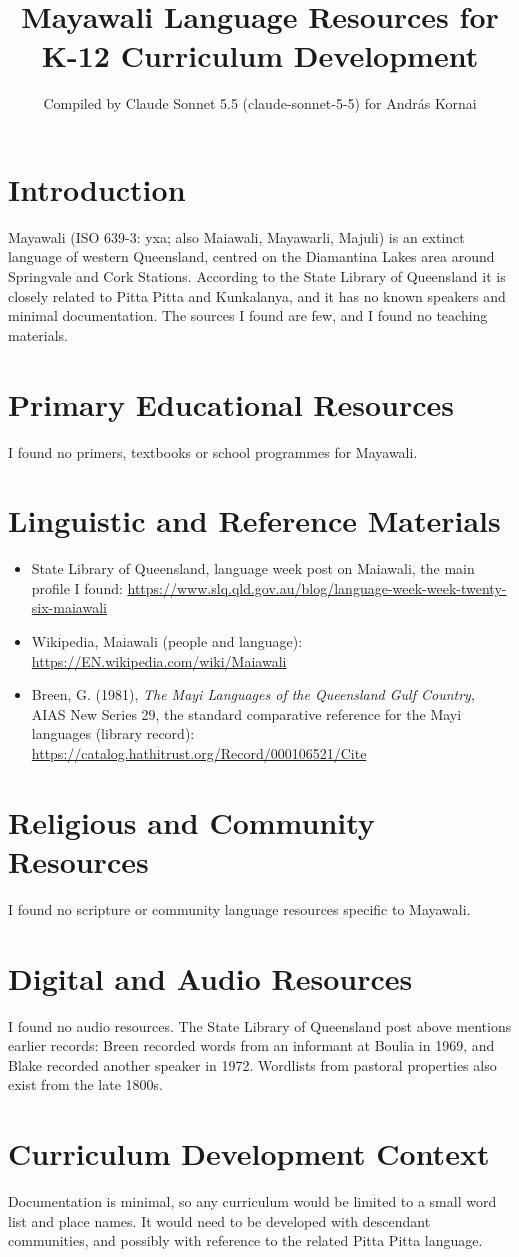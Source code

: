 \documentclass[12pt]{article}
\title{Mayawali Language Resources for K-12 Curriculum Development}
\author{Compiled by Claude Sonnet 5.5 (claude-sonnet-5-5) for Andr\'as Kornai}
\date{}
\begin{document}
\maketitle

\section{Introduction}
Mayawali (ISO 639-3: yxa; also Maiawali, Mayawarli, Majuli) is an extinct language of western Queensland, centred on the Diamantina Lakes area around Springvale and Cork Stations. According to the State Library of Queensland it is closely related to Pitta Pitta and Kunkalanya, and it has no known speakers and minimal documentation. The sources I found are few, and I found no teaching materials.

\section{Primary Educational Resources}
I found no primers, textbooks or school programmes for Mayawali.

\section{Linguistic and Reference Materials}
\begin{itemize}
\item State Library of Queensland, language week post on Maiawali, the main profile I found: \url{https://www.slq.qld.gov.au/blog/language-week-week-twenty-six-maiawali}
\item Wikipedia, Maiawali (people and language): \url{https://EN.wikipedia.com/wiki/Maiawali}
\item Breen, G. (1981), \emph{The Mayi Languages of the Queensland Gulf Country}, AIAS New Series 29, the standard comparative reference for the Mayi languages (library record): \url{https://catalog.hathitrust.org/Record/000106521/Cite}
\end{itemize}

\section{Religious and Community Resources}
I found no scripture or community language resources specific to Mayawali.

\section{Digital and Audio Resources}
I found no audio resources. The State Library of Queensland post above mentions earlier records: Breen recorded words from an informant at Boulia in 1969, and Blake recorded another speaker in 1972. Wordlists from pastoral properties also exist from the late 1800s.

\section{Curriculum Development Context}
Documentation is minimal, so any curriculum would be limited to a small word list and place names. It would need to be developed with descendant communities, and possibly with reference to the related Pitta Pitta language.
\end{document}
